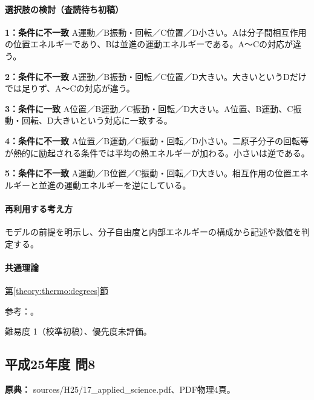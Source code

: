 \paragraph{選択肢の検討（査読待ち初稿）}\mbox{}\par

\noindent\textbf{1：条件に不一致} A運動／B振動・回転／C位置／D小さい。Aは分子間相互作用の位置エネルギーであり、Bは並進の運動エネルギーである。A〜Cの対応が違う。\par

\noindent\textbf{2：条件に不一致} A運動／B振動・回転／C位置／D大きい。大きいというDだけでは足りず、A〜Cの対応が違う。\par

\noindent\textbf{3：条件に一致} A位置／B運動／C振動・回転／D大きい。A位置、B運動、C振動・回転、D大きいという対応に一致する。\par

\noindent\textbf{4：条件に不一致} A位置／B運動／C振動・回転／D小さい。二原子分子の回転等が熱的に励起される条件では平均の熱エネルギーが加わる。小さいは逆である。\par

\noindent\textbf{5：条件に不一致} A運動／B位置／C振動・回転／D大きい。相互作用の位置エネルギーと並進の運動エネルギーを逆にしている。\par

\paragraph{再利用する考え方} モデルの前提を明示し、分子自由度と内部エネルギーの構成から記述や数値を判定する。

\paragraph{共通理論} \hyperref[theory:thermo:degrees]{第\ref*{theory:thermo:degrees}節}

\par 参考：\cite{mit_debye2005}。

\par 難易度 1（校準初稿）、優先度未評価。

\subsection{平成25年度 問8}
\label{q:h25-reg-applied-08}

\noindent\textbf{原典：} sources/H25/17\_applied\_science.pdf、PDF物理4頁。

